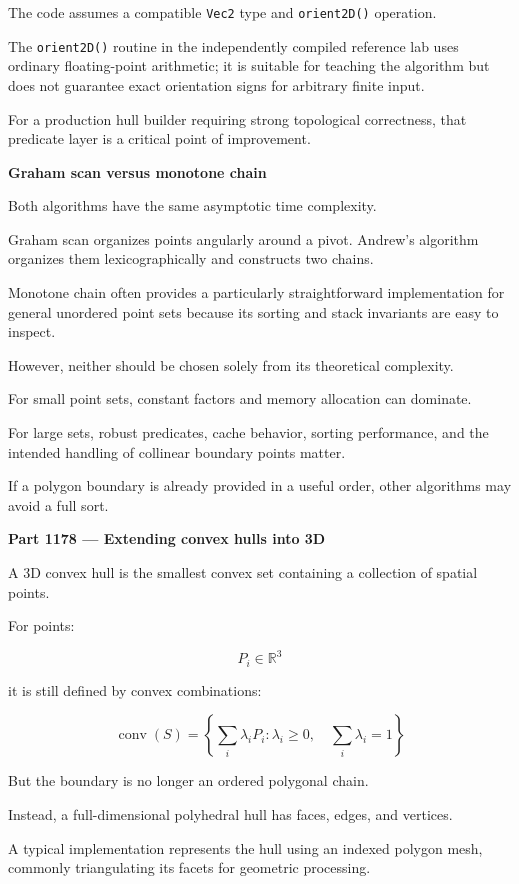 The code assumes a compatible \texttt{Vec2} type and \texttt{orient2D()} operation.

The \texttt{orient2D()} routine in the independently compiled reference lab uses ordinary floating-point arithmetic; it is suitable for teaching the algorithm but does not guarantee exact orientation signs for arbitrary finite input.

For a production hull builder requiring strong topological correctness, that predicate layer is a critical point of improvement.

\textbf{Graham scan versus monotone chain}

Both algorithms have the same asymptotic time complexity.

Graham scan organizes points angularly around a pivot. Andrew's algorithm organizes them lexicographically and constructs two chains.

Monotone chain often provides a particularly straightforward implementation for general unordered point sets because its sorting and stack invariants are easy to inspect.

However, neither should be chosen solely from its theoretical complexity.

For small point sets, constant factors and memory allocation can dominate.

For large sets, robust predicates, cache behavior, sorting performance, and the intended handling of collinear boundary points matter.

If a polygon boundary is already provided in a useful order, other algorithms may avoid a full sort.

\textbf{Part 1178 --- Extending convex hulls into 3D}

A 3D convex hull is the smallest convex set containing a collection of spatial points.

For points:

\[
P_i\in\mathbb R^3
\]

it is still defined by convex combinations:

\[
\boxed{ \operatorname{conv}(S)= \left\{ \sum_i\lambda_iP_i: \lambda_i\ge0,\quad\sum_i\lambda_i=1 \right\} }
\]

But the boundary is no longer an ordered polygonal chain.

Instead, a full-dimensional polyhedral hull has faces, edges, and vertices.

A typical implementation represents the hull using an indexed polygon mesh, commonly triangulating its facets for geometric processing.

